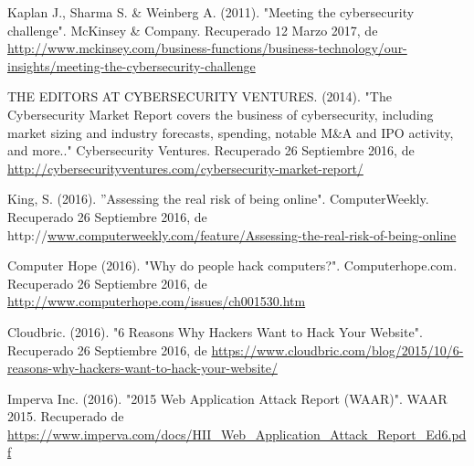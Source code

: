 
\begin{thebibliography}{99}


 Kaplan J., Sharma S. \& Weinberg A. (2011). "Meeting the cybersecurity challenge". McKinsey \& Company. Recuperado 12 Marzo 2017, de \url{http://www.mckinsey.com/business-functions/business-technology/our-insights/meeting-the-cybersecurity-challenge}

 THE EDITORS AT CYBERSECURITY VENTURES. (2014). "The Cybersecurity Market Report covers the business of cybersecurity, including market sizing and industry forecasts, spending, notable M\&A and IPO activity, and more.." Cybersecurity Ventures. Recuperado 26 Septiembre 2016, de \url{http://cybersecurityventures.com/cybersecurity-market-report/}

 King, S. (2016). ''Assessing the real risk of being online". ComputerWeekly. Recuperado 26 Septiembre 2016, de http://\url{www.computerweekly.com/feature/Assessing-the-real-risk-of-being-online}

 Computer Hope (2016). "Why do people hack computers?". Computerhope.com. Recuperado 26 Septiembre 2016, de \url{http://www.computerhope.com/issues/ch001530.htm}

 Cloudbric. (2016). "6 Reasons Why Hackers Want to Hack Your Website". Recuperado 26 Septiembre 2016, de \url{https://www.cloudbric.com/blog/2015/10/6-reasons-why-hackers-want-to-hack-your-website/}

 Imperva Inc. (2016). "2015 Web Application Attack Report (WAAR)". WAAR 2015. Recuperado de \url{https://www.imperva.com/docs/HII\_Web\_Application\_Attack\_Report\_Ed6.pdf}



\end{thebibliography}

